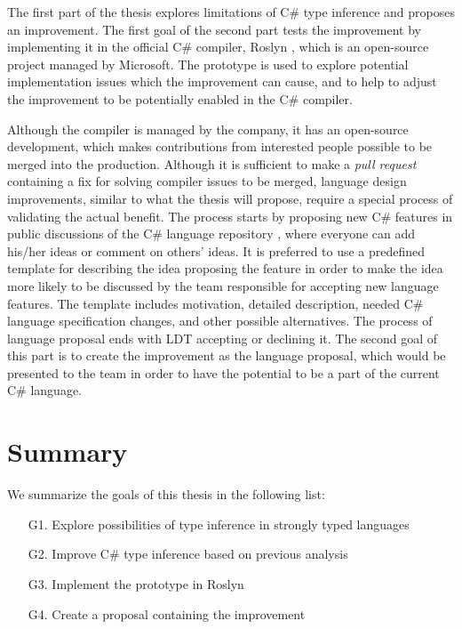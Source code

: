 The first part of the thesis explores limitations of C\# type inference and proposes an improvement.
The first goal of the second part tests the improvement by implementing it in the official C\# compiler, Roslyn \cite{online:roslynRepo}, which is an open-source project managed by Microsoft.
The prototype is used to explore potential implementation issues which the improvement can cause, and to help to adjust the improvement to be potentially enabled in the C\# compiler.
\par
Although the compiler is managed by the company, it has an open-source development, which makes contributions from interested people possible to be merged into the production.
Although it is sufficient to make a \textit{pull request} containing a fix for solving compiler issues to be merged, language design improvements, similar to what the thesis will propose, require a special process of validating the actual benefit.
The process starts by proposing new C\# features in public discussions of the C\# language repository \cite{online:langRepo}, where everyone can add his/her ideas or comment on others' ideas. 
It is preferred to use a predefined template \cite{online:proposalTemplate} for describing the idea proposing the feature in order to make the idea more likely to be discussed by the team responsible for accepting new language features. 
The template includes motivation, detailed description, needed C\# language specification \cite{online:langSpec} changes, and other possible alternatives.
The process of language proposal ends with LDT accepting or declining it. 
The second goal of this part is to create the improvement as the language proposal, which would be presented to the team in order to have the potential to be a part of the current C\# language.

\section{Summary} \label{sect:summary}

We summarize the goals of this thesis in the following list:

\begin{enumerate}
  \item[G1.] Explore possibilities of type inference in strongly typed languages
  \item[G2.] Improve C\# type inference based on previous analysis
  \item[G3.] Implement the prototype in Roslyn
  \item[G4.] Create a proposal containing the improvement
\end{enumerate}